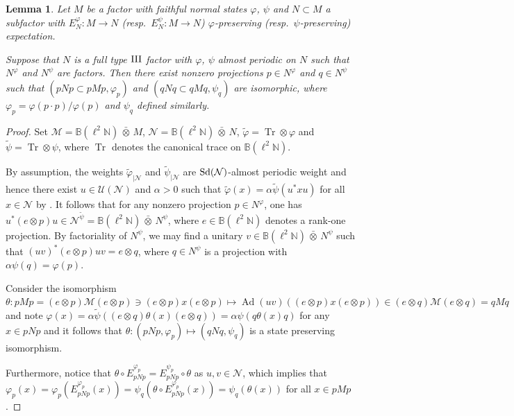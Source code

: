 \documentclass[a4paper,11pt]{amsart}
\newtheorem{lem}[thm]{Lemma}
\theoremstyle{definition}
\newcommand{\B}{{\mathbb B}}
\newcommand{\N}{{\mathbb N}}
\newcommand{\cM}{{\mathcal M}}
\newcommand{\cN}{{\mathcal N}}
\newcommand{\cU}{{\mathcal U}}
\newcommand{\Ad}{\operatorname{Ad}}
\newcommand{\Tr}{\operatorname{Tr}}
\newcommand{\ot}{\otimes}
\newcommand{\ovt}{\, \bar{\otimes}\,}
\begin{document}
\begin{lem}\label{lem: almost periodic state}
Let $M$ be a factor with faithful normal states $\varphi$, $\psi$ and $N\subset M$ a subfactor with $E_N^\varphi: M\to N$
	(resp.\ $E_N^\psi: M\to N$) $\varphi$-preserving (resp.\ $\psi$-preserving) expectation.	
	
Suppose that $N$ is a full type ${\rm III}$ factor with $\varphi$, $\psi$ almost periodic on $N$
	such that $N^\varphi$ and $N^\psi$ are factors.
Then there exist nonzero projections $p\in N^\varphi$ and $q\in N^\psi$
	such that $(pNp\subset pMp, \varphi_p)$ and $(qNq\subset qMq, \psi_q)$ are isomorphic,
	where $\varphi_p=\varphi(p\cdot p)/\varphi(p)$ and $\psi_q$ defined similarly. 
\end{lem}
\begin{proof}
Set $\cM=\B(\ell^2\N)\ovt M$, $\cN=\B(\ell^2\N)\ovt N$, $\tilde\varphi=\Tr\ot \varphi$ and $\tilde\psi=\Tr\ot \psi$,
	where $\Tr$ denotes the canonical trace on $\B(\ell^2\N)$.
	
By assumption, the weights $\tilde\varphi_{\mid \cN}$ and $\tilde \psi_{\mid \cN}$ are ${\rm Sd}(\cN)$-almost periodic weight \cite[Lemma 4.8]{Con74}
	and hence there exist $u\in \cU(\cN)$ and $\alpha>0$ such that $\tilde\varphi(x)=\alpha\tilde \psi(u^* xu)$ for all $x\in \cN$
	by \cite[Theorem 4.7]{Con74}.
It follows that for any nonzero projection $p\in N^\varphi$, one has $u^*(e\ot p) u\in \cN^{\tilde \psi}=\B(\ell^2\N)\ovt N^\psi$,
	where $e\in \B(\ell^2\N)$ denotes a rank-one projection.
By factoriality of $N^\psi$, we may find a unitary $v\in \B(\ell^2\N)\ovt N^\psi$
	such that $(uv)^*(e\ot p) uv=e\ot q$,
	where $q\in N^\psi$ is a projection with $\alpha\psi(q)=\varphi(p)$.

Consider the isomorphism $\theta: pMp=(e\ot p)\cM (e\ot p)\ni (e\ot p)x(e\ot p)\mapsto \Ad(uv)((e\ot p)x (e\ot p))\in (e\ot q)\cM (e\ot q)=qMq$
	and note
	$\varphi(x)= \alpha \tilde \psi( (e\ot q)\theta(x)(e\ot q))=\alpha\psi(q \theta(x)q)$ for any $x\in pNp$
	and it follows that $\theta: (pNp, \varphi_p)\mapsto (qNq, \psi_q)$ is a state preserving isomorphism.

Furthermore, notice that $\theta \circ E_{pNp}^{\varphi_p} = E_{pNp}^{\psi_p}\circ \theta$ as $u,v\in \cN$,
	which implies that $\varphi_p(x)=\varphi_p(E_{pNp}^{\varphi_p}(x))=\psi_q(\theta\circ E_{pNp}^{\varphi_p}(x))=\psi_q(\theta(x))$ 
	for all $x\in pMp$. 
\end{proof}
\end{document}
